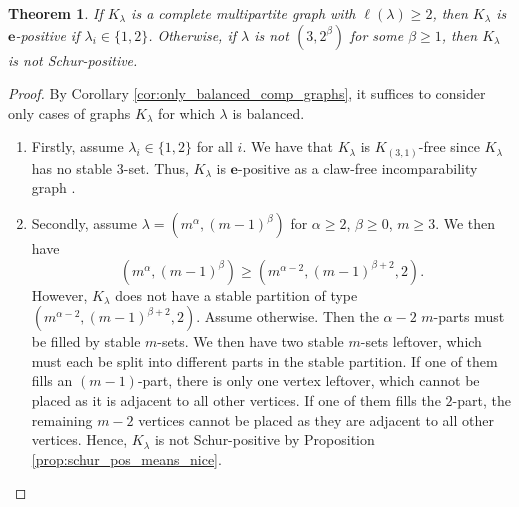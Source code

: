 \documentclass[12pt]{amsart}
\numberwithin{equation}{section}
\theoremstyle{plain}
\newtheorem{theorem}[equation]{Theorem}
\theoremstyle{definition}
\theoremstyle{remark}
\begin{document}
\begin{theorem}
\label{thm:only_K32_may_b_s_pos}
If $K_{\lambda}$ is a complete multipartite graph with $\ell(\lambda)\ge 2$, then $K_{\lambda}$ is $\mathbf{e}$-positive if $\lambda_i\in\{1,2\}$. Otherwise, if $\lambda$ is not $(3,2^{\beta})$ for  some $\beta\ge 1$, then $K_{\lambda}$ is not Schur-positive. 
\end{theorem}
\begin{proof}
By Corollary \ref{cor:only_balanced_comp_graphs}, it suffices to consider only cases of graphs $K_{\lambda}$ for which $\lambda$ is balanced.
\begin{enumerate}
    \item Firstly, assume $\lambda_i\in\{1,2\}$ for all $i$. We have that $K_{\lambda}$ is $K_{(3,1)}$-free since $K_{\lambda}$ has no stable $3$-set. Thus, $K_{\lambda}$ is $\mathbf{e}$-positive as a claw-free incomparability graph \cite{hikita24}.

    
    
    \item Secondly, assume $\lambda=(m^{\alpha},(m-1)^{\beta})$ for $\alpha\ge 2$, $\beta\ge 0$, $m\ge 3$. We then have
    \[
    (m^{\alpha},(m-1)^{\beta})\ge (m^{\alpha-2},(m-1)^{\beta+2},2).
    \]
However, $K_{\lambda}$ does not have a stable partition of type $(m^{\alpha-2},(m-1)^{\beta+2},2)$. Assume otherwise. Then the $\alpha-2$ $m$-parts must be filled by stable $m$-sets. We then have two stable $m$-sets leftover, which must each be split into different parts in the stable partition. If one of them fills an $(m-1)$-part, there is only one vertex leftover, which cannot be placed as it is adjacent to all other vertices. If one of them fills the $2$-part, the remaining $m-2$ vertices cannot be placed as they are adjacent to all other vertices. Hence, $K_{\lambda}$ is not Schur-positive by Proposition \ref{prop:schur_pos_means_nice}.







\end{enumerate}
\end{proof}
\end{document}
